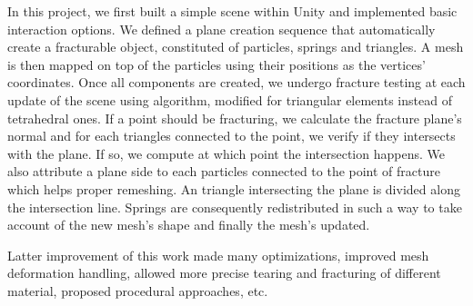 \documentclass[tog]{acmsiggraph}
\begin{document}
In this project, we first built a simple scene within Unity and implemented basic interaction options. We defined a plane creation sequence that automatically create a fracturable object, constituted of particles, springs and triangles. A mesh is then mapped on top of the particles using their positions as the vertices' coordinates. Once all components are created, we undergo fracture testing at each update of the scene using \cite{Obrien:1999:GMA} algorithm, modified for triangular elements instead of tetrahedral ones. If a point should be fracturing, we calculate the fracture plane's normal and for each triangles connected to the point, we verify if they intersects with the plane. If so, we compute at which point the intersection happens. We also attribute a plane side to each particles connected to the point of fracture which helps proper remeshing. An triangle intersecting the plane is divided along the intersection line. Springs are consequently redistributed in such a way to take account of the new mesh's shape and finally the mesh's updated.

Latter improvement of this work made many optimizations, improved mesh deformation handling, allowed more precise tearing and fracturing of different material, proposed procedural approaches, etc.  





  
\end{document}
